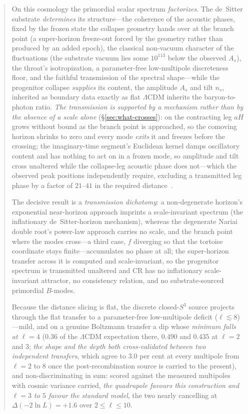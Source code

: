 \documentclass[11pt,a4paper]{article}
\theoremstyle{plain}
\theoremstyle{definition}
\theoremstyle{remark}
\begin{document}
\begin{abstract}
On this cosmology the primordial scalar spectrum \emph{factorizes}. The de~Sitter substrate \emph{determines} its structure---the coherence of the acoustic phases, fixed by the frozen state the collapse geometry hands over at the branch point (a super-horizon freeze-out forced by the geometry rather than produced by an added epoch), the classical non-vacuum character of the fluctuations (the substrate vacuum lies some $10^{113}$ below the observed $A_s$), the throat's isotropization, a parameter-free low-multipole discreteness floor, and the faithful transmission of the spectral shape---while the progenitor collapse \emph{supplies} its content, the amplitude $A_s$ and tilt $n_s$, inherited as boundary data exactly as flat $\Lambda$CDM inherits the baryon-to-photon ratio. \emph{The transmission is supported by a mechanism rather than by the absence of a scale alone} (\S\ref{sec:what-crosses}): on the contracting leg $aH$ grows without bound as the branch point is approached, so the comoving horizon shrinks to zero and every mode \emph{exits} it and freezes before the crossing; the imaginary-time segment's Euclidean kernel damps oscillatory content and has nothing to act on in a frozen mode, so amplitude and tilt cross unaltered while the collapse-leg acoustic phase does not---which the observed peak positions independently require, excluding a transmitted leg phase by a factor of $21$--$41$ in the required distance~\cite{JanzenCRframework}. 

The decisive result is a \emph{transmission dichotomy}: a non-degenerate horizon's exponential near-horizon approach imprints a scale-invariant spectrum (the inflationary de~Sitter-horizon mechanism), whereas the degenerate Nariai double root's power-law approach carries no scale, and the branch point where the modes cross---a third case, $f$ diverging so that the tortoise coordinate stays finite---accumulates no phase at all; the super-horizon transfer across it is computed and scale-invariant, so the progenitor spectrum is transmitted unaltered and CR has no inflationary scale-invariant attractor, no consistency relation, and no substrate-sourced primordial $B$-modes. 

Because the distance slicing is flat, the discrete closed-$S^3$ source projects through the flat transfer to a parameter-free low-multipole deficit ($\ell\lesssim8$)---mild, and on a genuine Boltzmann transfer a dip whose \emph{minimum falls at $\ell=4$} ($0.36$ of the $\Lambda$CDM expectation there, $0.490$ and $0.435$ at $\ell=2$ and $3$; \emph{the shape and the depth both cross-validated between two independent transfers}, which agree to $3.0$ per cent at every multipole from $\ell=2$ to $8$ once the post-recombination source is carried to the present), and non-discriminating in sum: scored against the measured multipoles with cosmic variance carried, \emph{the quadrupole favours this construction and $\ell=3$ to $5$ favour the standard model}, the two nearly cancelling at $\Delta(-2\ln L)=+1.6$ over $2\le\ell\le10$. 


\end{abstract}
\end{document}
